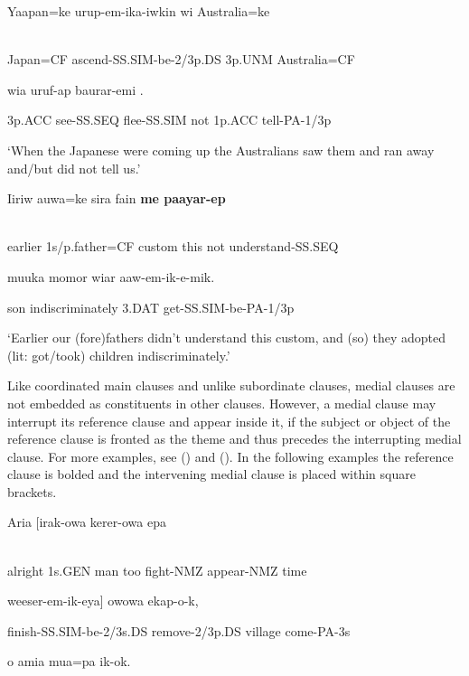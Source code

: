 \ea%
\label{ex:x1446}
\gll Yaapan=ke  urup-em-ika-iwkin  wi  Australia=ke \\
      \\
\glt
\z

Japan=CF  ascend-SS.SIM-be-2/3p.DS  3p.UNM  Australia=CF

wia  uruf-ap  baurar-emi  .

3p.ACC  see-SS.SEQ  flee-SS.SIM  not  1p.ACC  tell-PA-1/3p

`When the Japanese were coming up the Australians saw them and ran away and/but did not tell us.'

\ea%
\label{ex:x1448}
\gll Iiriw  auwa=ke  sira  fain  \textbf{me  paayar-ep} \\
      \\
\glt
\z

earlier  1s/p.father=CF  custom  this  not  understand-SS.SEQ

muuka  momor  wiar  aaw-em-ik-e-mik.

son  indiscriminately  3.DAT  get-SS.SIM-be-PA-1/3p

`Earlier our (fore)fathers didn't understand this custom, and (so) they adopted (lit: got/took) children indiscriminately.'

Like coordinated main clauses and unlike subordinate clauses, medial clauses are not embedded as constituents in other clauses. However, a medial clause may interrupt its reference clause and appear inside it, if the subject or object  of the reference clause is fronted as the theme and thus precedes the interrupting medial clause. For more examples, see () and (). In the following examples the reference clause is bolded and the intervening medial clause is placed within square brackets.

\ea%
\label{ex:x1464}
\gll Aria    [irak-owa  kerer-owa  epa  \\
      \\
\glt
\z

alright  1s.GEN  man  too  fight-NMZ  appear-NMZ  time

weeser-em-ik-eya]    owowa  ekap-o-k,

finish-SS.SIM-be-2/3s.DS  remove-2/3p.DS  village  come-PA-3s

o  amia  mua=pa  ik-ok.

